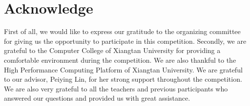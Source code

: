 
\section*{Acknowledge}
First of all, we would like to express our gratitude to the organizing committee for giving us the opportunity to participate in this competition. 
Secondly, we are grateful to the Computer College of Xiangtan University for providing a comfortable environment during the competition. 
We are also thankful to the High Performance Computing Platform of Xiangtan University. 
We are grateful to our advisor, Peiying Lin, for her strong support throughout the competition. 
We are also very grateful to all the teachers and previous participants who answered our questions and provided us with great assistance.